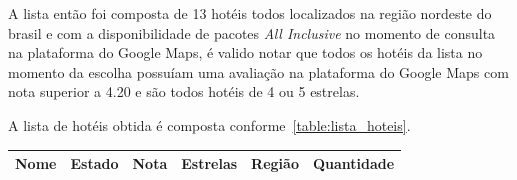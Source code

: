 A lista então foi composta de 13 hotéis todos localizados na região nordeste do brasil e com a disponibilidade de pacotes \emph{All Inclusive} no momento de consulta na plataforma do Google Maps, é valido notar que todos os hotéis da lista no momento da escolha possuíam uma avaliação na plataforma do Google Maps com nota superior a 4.20 e são todos hotéis de 4 ou 5 estrelas.

A lista de hotéis obtida é composta conforme~\ref{table:lista_hoteis}.

\begin{table}[]
	\begin{tabular}{|p{5cm}|l|r|r|l|r|}
		\hline
		\textbf{Nome}                                 & \textbf{Estado} & \textbf{Nota} & \textbf{Estrelas} & \textbf{Região} & \textbf{Quantidade} \\\hline


\end{tabular}
\end{table}
